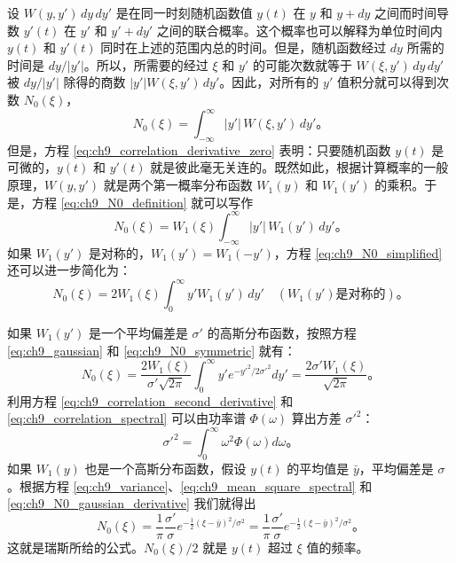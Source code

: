 设 $ W(y, y') \, dy \, dy' $ 是在同一时刻随机函数值 $ y(t) $ 在 $ y $ 和 $ y + dy $ 之间而时间导数 $ y'(t) $ 在 $ y' $ 和 $ y' + dy' $ 之间的联合概率。这个概率也可以解释为单位时间内 $ y(t) $ 和 $ y'(t) $ 同时在上述的范围内总的时间。但是，随机函数经过 $ dy $ 所需的时间是 $ dy/|y'| $。所以，所需要的经过 $\xi$ 和 $ y' $ 的可能次数就等于 $ W(\xi, y') \, dy \, dy' $ 被 $ dy/|y'| $ 除得的商数 $ |y'|W(\xi, y') \, dy' $。因此，对所有的 $ y' $ 值积分就可以得到次数 $ N_0(\xi) $，
\begin{equation}\label{eq:ch9_N0_definition}
N_0(\xi) = \int_{-\infty}^{\infty} |y'| \, W(\xi, y') \, dy'。
\end{equation}
但是，方程 \eqref{eq:ch9_correlation_derivative_zero} 表明：只要随机函数 $ y(t) $ 是可微的，$ y(t) $ 和 $ y'(t) $ 就是彼此毫无关连的。既然如此，根据计算概率的一般原理，$ W(y, y') $ 就是两个第一概率分布函数 $ W_1(y) $ 和 $ W_1(y') $ 的乘积。于是，方程 \eqref{eq:ch9_N0_definition} 就可以写作
\begin{equation}\label{eq:ch9_N0_simplified}
N_0(\xi) = W_1(\xi) \int_{-\infty}^{\infty} |y'| \, W_1(y') \, dy'。
\end{equation}
如果 $ W_1(y') $ 是对称的，$ W_1(y') = W_1(-y') $，方程 \eqref{eq:ch9_N0_simplified} 还可以进一步简化为：
\begin{equation}\label{eq:ch9_N0_symmetric}
N_0(\xi) = 2W_1(\xi) \int_{0}^{\infty} y'W_1(y') \, dy' \quad (W_1(y') \text{是对称的})。
\end{equation}

如果 $ W_1(y') $ 是一个平均偏差是 $ \sigma' $ 的高斯分布函数，按照方程 \eqref{eq:ch9_gaussian} 和 \eqref{eq:ch9_N0_symmetric} 就有：
\begin{equation}\label{eq:ch9_N0_gaussian_derivative}
N_0(\xi) = \frac{2W_1(\xi)}{\sigma' \sqrt{2\pi}} \int_0^\infty y' e^{-y'^2/2\sigma'^2} dy' = \frac{2\sigma' W_1(\xi)}{\sqrt{2\pi}}。
\end{equation}
利用方程 \eqref{eq:ch9_correlation_second_derivative} 和 \eqref{eq:ch9_correlation_spectral} 可以由功率谱 $ \Phi(\omega) $ 算出方差 $ \sigma'^2 $：
\begin{equation}\label{eq:ch9_sigma_prime_sq}
\sigma'^2 = \int_0^\infty \omega^2 \Phi(\omega) d\omega。
\end{equation}
如果 $ W_1(y) $ 也是一个高斯分布函数，假设 $ y(t) $ 的平均值是 $ \bar{y} $，平均偏差是 $ \sigma $。根据方程 \eqref{eq:ch9_variance}、\eqref{eq:ch9_mean_square_spectral} 和 \eqref{eq:ch9_N0_gaussian_derivative} 我们就得出
\begin{equation}\label{eq:ch9_Rice_formula}
N_0(\xi) = \frac{1}{\pi} \frac{\sigma'}{\sigma} e^{-\frac{1}{2}(\xi-\bar{y})^2/\sigma^2} = \frac{1}{\pi} \frac{\sigma'}{\sigma} e^{-\frac{1}{2}(\xi-\bar{y})^2/\sigma^2}。
\end{equation}
这就是瑞斯所给的公式。$ N_0(\xi)/2 $ 就是 $ y(t) $ 超过 $ \xi $ 值的频率。



